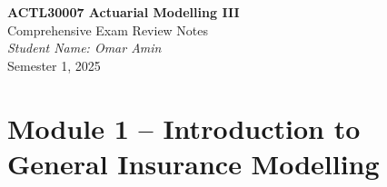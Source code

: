 \documentclass[11pt]{article}
\begin{document}
\begin{titlepage}
\begin{center}
{\LARGE \textbf{ACTL30007 Actuarial Modelling III}}\\[1.5em]
{\Large Comprehensive Exam Review Notes}\\[10em]
{\large \textit{Student Name: Omar Amin}}\\[1em]
{\large Semester 1, 2025}
\end{center}
\end{titlepage}

\tableofcontents
\newpage

\section{Module 1 – Introduction to General Insurance Modelling}
\end{document}
